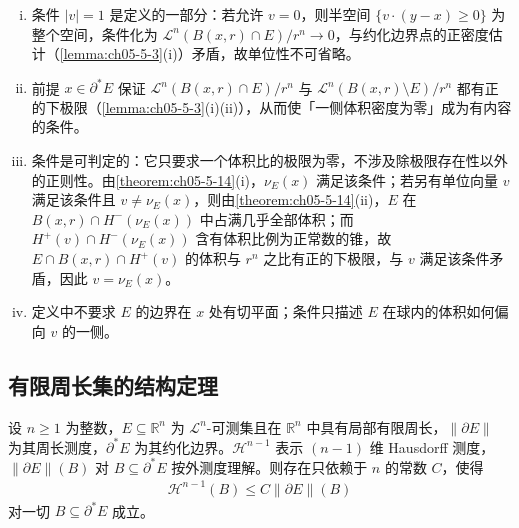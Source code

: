 \documentclass[../../main.tex]{subfiles}%
\begin{document}
\begin{remark}\label{remark:ch05-def-5-6-b-b}
\begin{enumerate}[(i)]
\item 条件 $\lvert v\rvert=1$ 是定义的一部分：若允许 $v=0$，则半空间 $\{v\cdot(y-x)\geqslant0\}$ 为整个空间，条件化为 $\mathcal{L}^n(B(x,r)\cap E)/r^n\to0$，与约化边界点的正密度估计（\cref{lemma:ch05-5-3}(i)）矛盾，故单位性不可省略。%
\item 前提 $x\in\partial^*E$ 保证 $\mathcal{L}^n(B(x,r)\cap E)/r^n$ 与 $\mathcal{L}^n(B(x,r)\setminus E)/r^n$ 都有正的下极限（\cref{lemma:ch05-5-3}(i)(ii)），从而使「一侧体积密度为零」成为有内容的条件。%
\item 条件是可判定的：它只要求一个体积比的极限为零，不涉及除极限存在性以外的正则性。由\cref{theorem:ch05-5-14}(i)，$\nu_E(x)$ 满足该条件；若另有单位向量 $v$ 满足该条件且 $v\neq\nu_E(x)$，则由\cref{theorem:ch05-5-14}(ii)，$E$ 在 $B(x,r)\cap H^-(\nu_E(x))$ 中占满几乎全部体积；而 $H^+(v)\cap H^-(\nu_E(x))$ 含有体积比例为正常数的锥，故 $E\cap B(x,r)\cap H^+(v)$ 的体积与 $r^n$ 之比有正的下极限，与 $v$ 满足该条件矛盾，因此 $v=\nu_E(x)$。%
\item 定义中不要求 $E$ 的边界在 $x$ 处有切平面；条件只描述 $E$ 在球内的体积如何偏向 $v$ 的一侧。
\end{enumerate}
\end{remark}

\subsection{有限周长集的结构定理}\label{subsection:ch05-07-3}

\begin{lemma}\label{lemma:ch05-5-4}
设 $n\geqslant1$ 为整数，$E\subseteq\mathbb{R}^n$ 为 $\mathcal{L}^n$-可测集且在 $\mathbb{R}^n$ 中具有局部有限周长，$\lVert\partial E\rVert$ 为其周长测度，$\partial^*E$ 为其约化边界。$\mathcal{H}^{n-1}$ 表示 $(n-1)$ 维 Hausdorff 测度，$\lVert\partial E\rVert(B)$ 对 $B\subseteq\partial^*E$ 按外测度理解。则存在只依赖于 $n$ 的常数 $C$，使得
\begin{align*}
\mathcal{H}^{n-1}(B)\leqslant C\lVert\partial E\rVert(B)
\end{align*}
对一切 $B\subseteq\partial^*E$ 成立。
\end{lemma}
\end{document}
